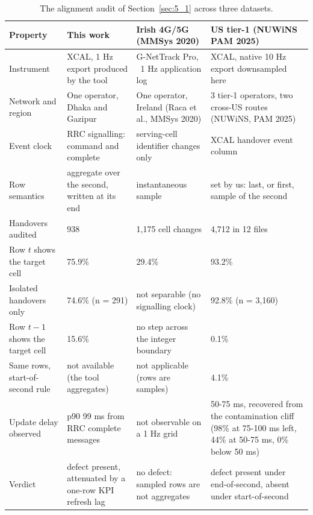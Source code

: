 \begin{table}[htbp]
\centering
\caption{The alignment audit of Section~\ref{sec:5_1} across three datasets.}
\label{tab:A_3}
\vspace{0.4em}
\singlespacing
\small
\begin{tabularx}{\linewidth}{p{2.8cm} X X X}
\toprule
\textbf{Property} & \textbf{This work} & \textbf{Irish 4G/5G (MMSys 2020)} & \textbf{US tier-1 (NUWiNS PAM 2025)} \\
\midrule
Instrument & XCAL, 1 Hz export produced by the tool & G-NetTrack Pro, ~1 Hz application log & XCAL, native 10 Hz export downsampled here \\
Network and region & One operator, Dhaka and Gazipur & One operator, Ireland (Raca et al., MMSys 2020) & 3 tier-1 operators, two cross-US routes (NUWiNS, PAM 2025) \\
Event clock & RRC signalling: command and complete & serving-cell identifier changes only & XCAL handover event column \\
Row semantics & aggregate over the second, written at its end & instantaneous sample & set by us: last, or first, sample of the second \\
Handovers audited & 938 & 1,175 cell changes & 4,712 in 12 files \\
Row $t$ shows the target cell & 75.9\% & 29.4\% & 93.2\% \\
Isolated handovers only & 74.6\% (n = 291) & not separable (no signalling clock) & 92.8\% (n = 3,160) \\
Row $t-1$ shows the target cell & 15.6\% & no step across the integer boundary & 0.1\% \\
Same rows, start-of-second rule & not available (the tool aggregates) & not applicable (rows are samples) & 4.1\% \\
Update delay observed & p90 99 ms from RRC complete messages & not observable on a 1 Hz grid & 50-75 ms, recovered from the contamination cliff (98\% at 75-100 ms left, 44\% at 50-75 ms, 0\% below 50 ms) \\
Verdict & defect present, attenuated by a one-row KPI refresh lag & no defect: sampled rows are not aggregates & defect present under end-of-second, absent under start-of-second \\
\bottomrule
\end{tabularx}
\end{table}


